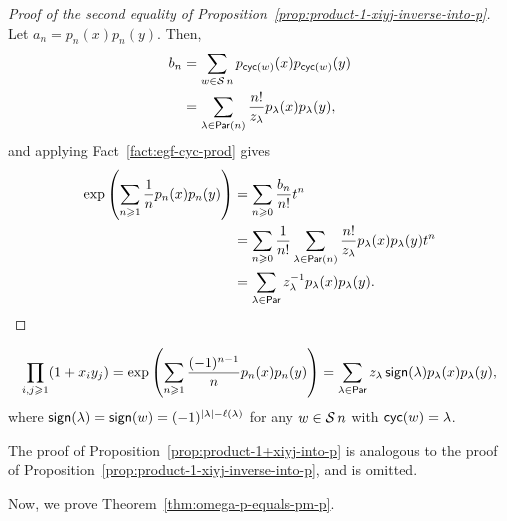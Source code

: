 \begin{proof}[Proof of the second equality of Proposition~\ref{prop:product-1-xiyj-inverse-into-p}]
	Let \(a_n = p_n(x)p_n(y)\).
	Then,
	\begin{align}
		b_n
		&= \sum_{w \in \operatorname{\mathcal{S}}{n}} p_{\operatorname{\mathsf{cyc}}(w)}(x) p_{\operatorname{\mathsf{cyc}}(w)}(y) \\
		&= \sum_{\lambda \in \operatorname{\mathsf{Par}}(n)} \frac{n!}{z_\lambda} p_\lambda(x) p_\lambda(y),
	\end{align}
	and applying Fact~\ref{fact:egf-cyc-prod} gives
	\begin{align}
		\exp\left(
			\sum_{n \geqslant 1} \frac{1}{n} p_n(x) p_n(y)
		\right)
		&= \sum_{n \geqslant 0} \frac{b_n}{n!} t^n \\
		&= \sum_{n \geqslant 0} \frac{1}{n!} \sum_{\lambda \in \operatorname{\mathsf{Par}}(n)} \frac{n!}{z_\lambda} p_\lambda(x) p_\lambda(y) t^n \\
		&= \sum_{\lambda \in \operatorname{\mathsf{Par}}} z_\lambda^{-1} p_\lambda(x) p_\lambda(y). \qedhere
	\end{align}
\end{proof}

\begin{proposition} \label{prop:product-1+xiyj-into-p}
	\begin{equation}
		\prod_{i, j \geqslant 1} (1 + x_iy_j)
		= \exp \left( \sum_{n \geqslant 1} \frac{(-1)^{n-1}}{n} p_n(x) p_n(y) \right)
		= \sum_{\lambda \in \operatorname{\mathsf{Par}}} z_\lambda \operatorname{\mathsf{sign}}(\lambda) p_\lambda(x) p_\lambda(y),
	\end{equation}
	where \(\operatorname{\mathsf{sign}}(\lambda) = \operatorname{\mathsf{sign}}(w) = (-1)^{|\lambda| - \ell(\lambda)}\) for any \(w \in \operatorname{\mathcal{S}}{n}\) with \(\operatorname{\mathsf{cyc}}(w) = \lambda\).
\end{proposition}

The proof of Proposition~\ref{prop:product-1+xiyj-into-p} is analogous to the proof of Proposition~\ref{prop:product-1-xiyj-inverse-into-p}, and is omitted.

Now, we prove Theorem~\ref{thm:omega-p-equals-pm-p}.

